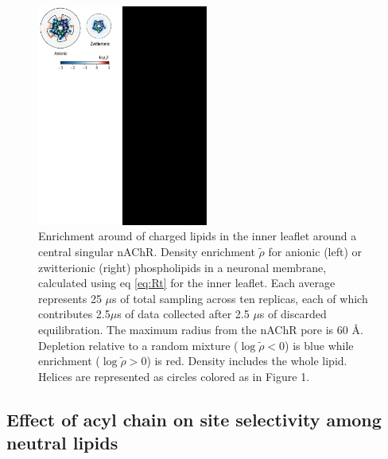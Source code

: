 \documentclass[%
 aip,
 amsmath,amssymb,
 preprint,%
]{revtex4-1}\usepackage{setspace}
\newcommand{\nachr}{nAChR}
\begin{document}
\begin{figure}[!h]
	\center
	\includegraphics[width=0.5\textwidth]{ChargedHG_heatmap.pdf}
	\caption{{Enrichment around of charged lipids in the inner leaflet around a central singular \nachr.}  Density enrichment $\tilde{\rho}$ for anionic (left) or zwitterionic (right) phospholipids in a neuronal membrane, calculated using eq \ref{eq:Rt} for the inner leaflet. Each average represents 25 $\mu$s of total sampling across ten replicas, each of which contributes 2.5$\mu$s of data collected after 2.5 $\mu$s of discarded equilibration. The maximum radius from the \nachr{} pore is 60 \AA. Depletion relative to a random mixture ($\log\tilde{\rho}< 0$) is blue while enrichment ($\log\tilde{\rho}> 0$) is red. Density includes the whole lipid.  Helices are represented as circles colored as in Figure 1. } 
	\label{fig:charge_map}
\end{figure}

\subsection{Effect of acyl chain on site selectivity among neutral lipids}

\end{document}
